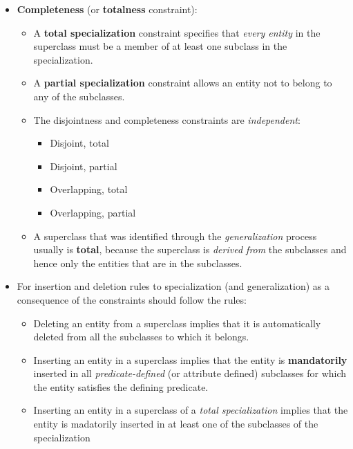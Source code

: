 \documentclass[10pt]{article}
\newcommand{\tf}{\textbf}
\newcommand{\ti}{\textit}
\begin{document}
\begin{enumerate}
\begin{itemize}
		\item \tf{Completeness} (or \tf{totalness} constraint):
		\begin{itemize}
			\item A \tf{total specialization} constraint specifies that \ti{every entity} in the superclass must be a member of at least one subclass in the specialization.
			\item A \tf{partial specialization} constraint allows an entity not to belong to any of the subclasses.
			\item The disjointness and completeness constraints are \ti{independent}:
			\begin{itemize}
				\item Disjoint, total
				\item Disjoint, partial
				\item Overlapping, total
				\item Overlapping, partial
			\end{itemize}

			\item A superclass that was identified through the \ti{generalization} process usually is \tf{total}, because the superclass is \ti{derived from} the subclasses and hence only the entities that are in the subclasses.
		\end{itemize}

		\item For insertion and deletion rules to specialization (and generalization) as a consequence of the constraints should follow the rules:
		\begin{itemize}
			\item Deleting an entity from a superclass implies that it is automatically deleted from all the subclasses to which it belongs.
			\item Inserting an entity in a superclass implies that the entity is \tf{mandatorily} inserted in all \ti{predicate-defined} (or attribute defined) subclasses for which the entity satisfies the defining predicate.
			\item Inserting an entity in a superclass of a \ti{total specialization} implies that the entity is madatorily inserted in at least one of the subclasses of the specialization
		\end{itemize}
	\end{itemize}
\end{enumerate}
\end{document}
